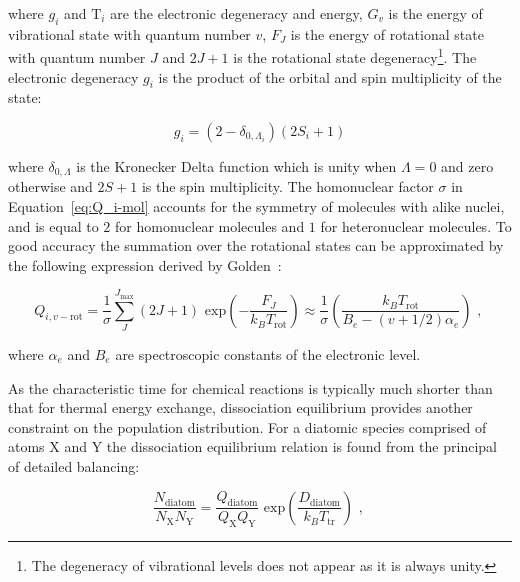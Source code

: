 \noindent where $g_i$ and $\mathrm{T}_i$ are the electronic degeneracy and energy, $G_{v}$ is the energy of vibrational state with quantum number $v$, $F_{J}$ is the energy of rotational state with quantum number $J$ and $2J+1$ is the rotational state degeneracy\footnote{The degeneracy of vibrational levels does not appear as it is always unity.}.
The electronic degeneracy $g_i$ is the product of the orbital and spin multiplicity of the state:

\begin{equation}
 g_i =  \left ( 2 - \delta_{0,\Lambda_i} \right ) \left ( 2 S_i + 1 \right )
\end{equation}

\noindent where $\delta_{0,\Lambda}$ is the Kronecker Delta function which is unity when $\Lambda=0$ and zero otherwise and $2S + 1$ is the spin multiplicity.
The homonuclear factor $\sigma$ in Equation~\ref{eq:Q_i-mol} accounts for the symmetry of molecules with alike nuclei, and is equal to $2$ for homonuclear molecules and $1$ for heteronuclear molecules.
To good accuracy the summation over the rotational states can be approximated by the following expression derived by Golden~\cite{Gol67}:

\begin{equation}
 Q_{i,v-\text{rot}} = \frac{1}{\sigma} \sum_{J}^{J_\text{max}} \left( 2J + 1 \right ) \text{~exp} \left ( - \frac{F_{J}}{k_B T_\text{rot}} \right ) \approx \frac{1}{\sigma} \left ( \frac{k_B T_\text{rot}}{B_{e} - (v + 1/2) \alpha_{e}} \right ) \text{ , }
  \label{eq:Q_rot}
\end{equation}

\noindent where $\alpha_{e}$ and $B_{e}$ are spectroscopic constants of the electronic level.

\par

As the characteristic time for chemical reactions is typically much shorter than that for thermal energy exchange, dissociation equilibrium provides another constraint on the population distribution. 
For a diatomic species comprised of atoms X and Y the dissociation equilibrium relation is found from the principal of detailed balancing:

\begin{equation}
 \frac{ N_\text{diatom} }{ N_\text{X} N_\text{Y} } = \frac{ Q_\text{diatom} }{ Q_\text{X} Q_\text{Y} } \text{~exp} \left ( \frac{D_\text{diatom}}{k_B T_\text{tr} } \right ) \text{ , } \label{eq:diatom_DE}
\end{equation}

